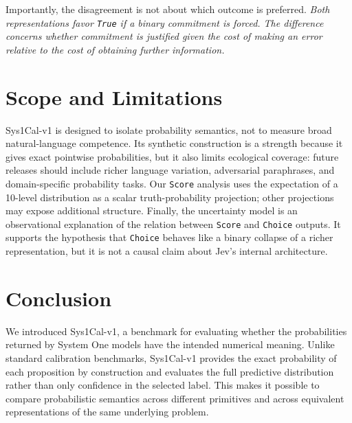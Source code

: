 \documentclass[twoside]{article}
\begin{document}
Importantly, the disagreement is not about which outcome is preferred.
\textit{Both representations favor \texttt{True} if a binary commitment is
forced. The difference concerns whether commitment is justified given
the cost of making an error relative to the cost of obtaining further
information.}



\section{Scope and Limitations}

Sys1Cal-v1 is designed to isolate probability semantics, not to measure broad natural-language competence. Its synthetic construction is a strength because it gives exact pointwise probabilities, but it also limits ecological coverage: future releases should include richer language variation, adversarial paraphrases, and domain-specific probability tasks. Our \texttt{Score} analysis uses the expectation of a 10-level distribution as a scalar truth-probability projection; other projections may expose additional structure. Finally, the uncertainty model is an observational explanation of the relation between \texttt{Score} and \texttt{Choice} outputs. It supports the hypothesis that \texttt{Choice} behaves like a binary collapse of a richer representation, but it is not a causal claim about Jev's internal architecture.



\section{Conclusion}

We introduced Sys1Cal-v1, a benchmark for evaluating whether the
probabilities returned by System One models have the intended numerical
meaning. Unlike standard calibration benchmarks, Sys1Cal-v1 provides the
exact probability of each proposition by construction and evaluates the
full predictive distribution rather than only confidence in the selected
label. This makes it possible to compare probabilistic semantics across
different primitives and across equivalent representations of the same
underlying problem.
\end{document}

